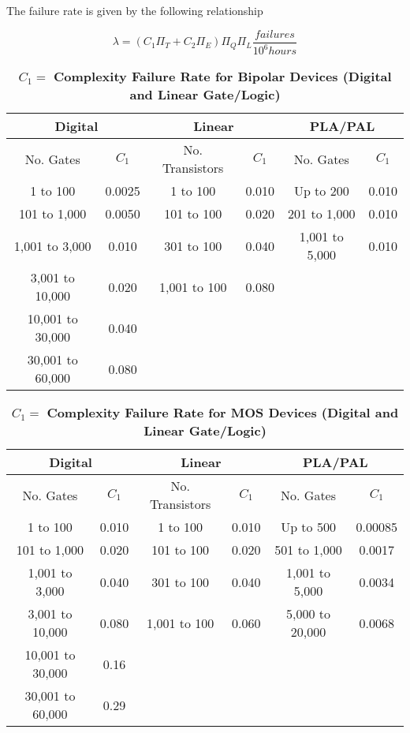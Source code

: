 The failure rate is given by the following relationship

$$\lambda = (C_{1}\Pi_{T} + C_{2}\Pi_{E}) \Pi_{Q} \Pi_{L} \frac{failures}{10^6 hours}$$



\begin{table}
\caption{ $C_{1} = $ \textbf{Complexity Failure Rate for Bipolar Devices (Digital and Linear Gate/Logic)}}
\label{table:complexFailureRateBjt}
\begin{tabular}{|c|c|c|c|c|c|} \hline
\multicolumn{2}{|c|}{\textbf{Digital}} 	& \multicolumn{2}{|c|}{\textbf{Linear}} & \multicolumn{2}{|c|}{\textbf{PLA/PAL}} \\ \hline
No. Gates & $C_{1}$ & No. Transistors &$C_{1}$ & No. Gates & $C_{1}$ \\ \hline
1 to 100 			& 0.0025 			& 1 to 100 		& 0.010 		& Up to 200 		& 0.010 		\\ \hline
101 to 1,000		& 0.0050 			& 101 to 100 		& 0.020 		& 201 to 1,000 	& 0.010 		\\ \hline
1,001 to 3,000		& 0.010				& 301 to 100 		& 0.040 		& 1,001 to 5,000 	& 0.010 		\\ \hline
3,001 to 10,000 	& 0.020 				& 1,001 to 100 	& 0.080 		& 				&			\\ \hline
10,001 to 30,000	& 0.040 				& 							& 				&			\\ \hline
30,001 to 60,000	& 0.080 				& 							& 				&			\\ \hline
\end{tabular}
\end{table}




\begin{table}
\caption{ $C_{1} = $  \textbf{Complexity Failure Rate for MOS Devices (Digital and Linear Gate/Logic)}}
\label{table:complexFailureRateIc}
\begin{tabular}{|c|c|c|c|c|c|} \hline
\multicolumn{2}{|c|}{\textbf{Digital}} & \multicolumn{2}{|c|}{\textbf{Linear}} & \multicolumn{2}{|c|}{\textbf{PLA/PAL}} \\ \hline
No. Gates & $C_{1}$ & No. Transistors &$C_{1}$ & No. Gates & $C_{1}$ \\ \hline
1 to 100 			& 0.010 			& 1 to 100 		& 0.010 		& Up to 500 			& 0.00085 	\\ \hline
101 to 1,000		& 0.020 			& 101 to 100 		& 0.020 		& 501 to 1,000 		& 0.0017 	\\ \hline
1,001 to 3,000		& 0.040			& 301 to 100 		& 0.040 		& 1,001 to 5,000 		& 0.0034 	\\ \hline
3,001 to 10,000 	& 0.080 			& 1,001 to 100 	& 0.060 		& 5,000 to 20,000		& 0.0068		\\ \hline
10,001 to 30,000	& 0.16 			& 							&					&			 \\ \hline
30,001 to 60,000	& 0.29 			& 							& 					&			\\ \hline
\end{tabular}
\end{table}

